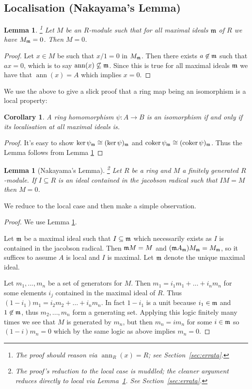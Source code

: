 \documentclass[12pt]{article}
\theoremstyle{plain}
\newtheorem{lemma}[thm]{Lemma}
\newtheorem{cor}[thm]{Corollary}
\theoremstyle{definition}
\newcommand{\lto}{\longrightarrow}
\begin{document}
\subsection{Localisation (Nakayama's Lemma)}
\begin{lemma}
\label{lem:localistation_zero}\footnote{The proof should reason via $\operatorname{ann}_R(x) = R$; see Section~\ref{sec:errata}.}
Let $M$ be an $R$-module such that for all maximal ideals $\frak{m}$ of $R$ we have $M_\frak{m} = 0$. Then $M = 0$.
\end{lemma}
\begin{proof}
Let $x \in M$ be such that $x/1 = 0$ in $M_\frak{m}$. Then there exists $a \not\in \frak{m}$ such that $ax = 0$, which is to say $\operatorname{ann}(x) \not\subseteq \frak{m}$. Since this is true for all maximal ideals $\frak{m}$ we have that $\operatorname{ann}(x) = A$ which implies $x = 0$.
\end{proof}
We use the above to give a slick proof that a ring map being an isomorphism is a local property:
\begin{cor}
\label{cor:isomorphism_is_local}
A ring homomorphism $\psi: A \lto B$ is an isomorphism if and only if its localisation at all maximal ideals is.
\end{cor}
\begin{proof}
It's easy to show $\ker \psi_{\frak{m}} \cong (\ker \psi)_{\frak{m}}$ and $\operatorname{coker} \psi_{\frak{m}} \cong (\operatorname{coker} \psi)_{\frak{m}}$. Thus the Lemma follows from Lemma \ref{lem:localistation_zero}
\end{proof}
\begin{lemma}[Nakayama's Lemma]\footnote{The proof's reduction to the local case is muddled; the cleaner argument reduces directly to local via Lemma~\ref{lem:localistation_zero}. See Section~\ref{sec:errata}.}
Let $R$ be a ring and $M$ a finitely generated $R$-module. If $I \subseteq R$ is an ideal contained in the jacobson radical such that $IM = M$ then $M = 0$.
\end{lemma}
We reduce to the local case and then make a simple observation.
\begin{proof}
We use Lemma \ref{lem:localistation_zero}.

Let $\frak{m}$ be a maximal ideal such that $I \subseteq \frak{m}$ which necessarily exists as $I$ is contained in the jacobson radical. Then $\frak{m}M = M$ and $(\frak{m}A_{\frak{m}})M_{\frak{m}} = M_{\frak{m}}$, so it suffices to assume $A$ is local and $I$ is maximal. Let $\frak{m}$ denote the unique maximal ideal.

Let $m_1,..., m_n$ be a set of generators for $M$. Then $m_1 = i_1m_1 + \hdots + i_nm_n$ for some elements $i_j$ contained in the maximal ideal of $R$. Thus $(1-i_1)m_1 = i_2m_2 + \hdots + i_nm_n$. In fact $1 - i_1$ is a unit because $i_1 \in \frak{m}$ and $1 \not\in \frak{m}$, thus $m_2,...,m_n$ form a generating set. Applying this logic finitely many times we see that $M$ is generated by $m_n$, but then $m_n = im_n$ for some $i \in \frak{m}$ so $(1 - i)m_n = 0$ which by the same logic as above implies $m_n = 0$.
\end{proof}
\end{document}
